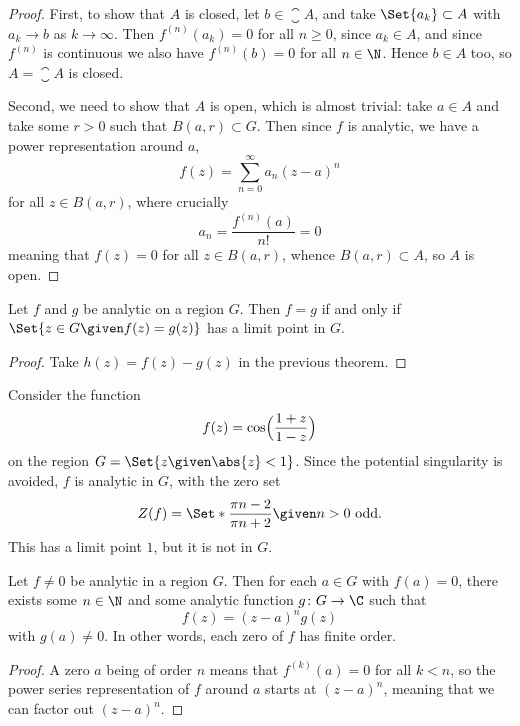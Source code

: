\begin{proof}
	First, to show that $A$ is closed, let $b \in \closure{A}$, and take $\Set{a_k} \subset A$ with $a_k \to b$ as $k \to \infty$.
	Then $f^{(n)}(a_k) = 0$ for all $n \geq 0$, since $a_k \in A$, and since $f^{(n)}$ is continuous we also have $f^{(n)}(b) = 0$ for all $n \in \N$.
	Hence $b \in A$ too, so $A = \closure{A}$ is closed.

	Second, we need to show that $A$ is open, which is almost trivial: take $a \in A$ and take some $r > 0$ such that $B(a, r) \subset G$.
	Then since $f$ is analytic, we have a power representation around $a$,
	\[
		f(z) = \sum_{n = 0}^\infty a_n (z - a)^n
	\]
	for all $z \in B(a, r)$, where crucially
	\[
		a_n = \frac{f^{(n)}(a)}{n!} = 0
	\]
	meaning that $f(z) = 0$ for all $z \in B(a, r)$, whence $B(a, r) \subset A$, so $A$ is open.
\end{proof}

\begin{corollary}\label{cor3.13}
	Let $f$ and $g$ be analytic on a region $G$.
	Then $f = g$ if and only if $\Set{z \in G \given f(z) = g(z)}$ has a limit point in $G$.
\end{corollary}

\begin{proof}
	Take $h(z) = f(z) - g(z)$ in the previous theorem.
\end{proof}

\begin{example}
	Consider the function
	\[
		f(z) = \cos\Bigl ( \frac{1 + z}{1 - z} \Bigr )
	\]
	on the region $G = \Set{z \given \abs{z} < 1}$.
	Since the potential singularity is avoided, $f$ is analytic in $G$, with the zero set
	\[
		Z(f) = \Set*{\frac{\pi n - 2}{\pi n + 2} \given n > 0 \text{ odd}}.
	\]
	This has a limit point $1$, but it is not in $G$.
\end{example}

\begin{corollary}\label{cor3.14}
	Let $f \neq 0$ be analytic in a region $G$.
	Then for each $a \in G$ with $f(a) = 0$, there exists some $n \in \N$ and some analytic function $g \colon G \to \C$ such that
	\[
		f(z) = (z - a)^n g(z)
	\]
	with $g(a) \neq 0$.
	In other words, each zero of $f$ has finite order.
\end{corollary}

\begin{proof}
	A zero $a$ being of order $n$ means that $f^{(k)}(a) = 0$ for all $k < n$, so the power series representation of $f$ around $a$ starts at $(z - a)^n$, meaning that we can factor out $(z - a)^n$.
\end{proof}

